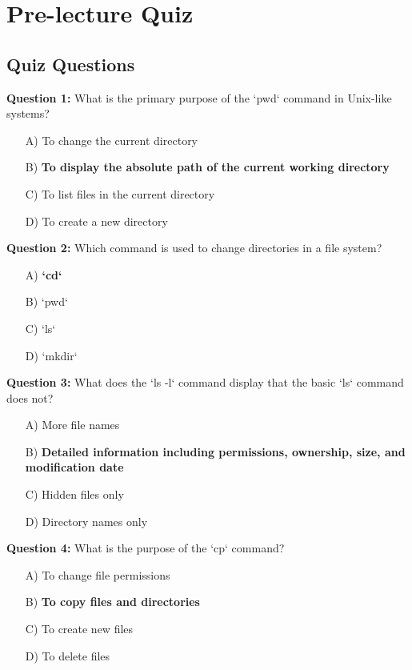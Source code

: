 \section{Pre-lecture Quiz}
\label{sec:file-mgmt:pre-quiz}

\subsection{Quiz Questions}

\textbf{Question 1:} What is the primary purpose of the `pwd` command in Unix-like systems?

\begin{enumerate}
    \item[A)] To change the current directory
    \item[B)] \textbf{To display the absolute path of the current working directory}
    \item[C)] To list files in the current directory
    \item[D)] To create a new directory
\end{enumerate}

\textbf{Question 2:} Which command is used to change directories in a file system?

\begin{enumerate}
    \item[A)] \textbf{`cd`}
    \item[B)] `pwd`
    \item[C)] `ls`
    \item[D)] `mkdir`
\end{enumerate}

\textbf{Question 3:} What does the `ls -l` command display that the basic `ls` command does not?

\begin{enumerate}
    \item[A)] More file names
    \item[B)] \textbf{Detailed information including permissions, ownership, size, and modification date}
    \item[C)] Hidden files only
    \item[D)] Directory names only
\end{enumerate}

\textbf{Question 4:} What is the purpose of the `cp` command?

\begin{enumerate}
    \item[A)] To change file permissions
    \item[B)] \textbf{To copy files and directories}
    \item[C)] To create new files
    \item[D)] To delete files
\end{enumerate}

